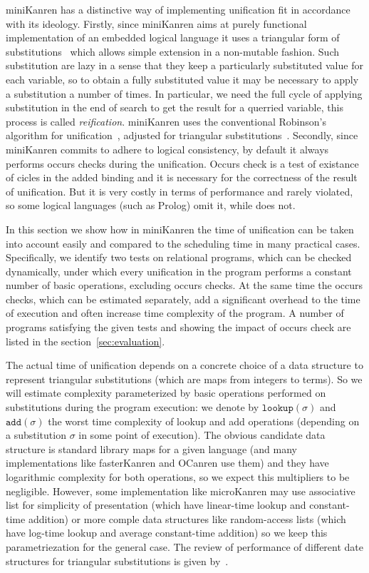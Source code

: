 \documentclass[acmsmall, anonymous, review]{acmart}
\newcommand{\sectionword}{section}
\newcommand{\mK}{miniKanren\xspace}
\newcommand{\lookuptime}[1]{\texttt{lookup}(#1)}
\newcommand{\addtime}[1]{\texttt{add}(#1)}
\begin{document}
\mK has a distinctive way of implementing unification fit in accordance with its ideology. Firstly, since \mK aims at purely functional implementation of an embedded logical language it uses a triangular form of substitutions~\cite{UnificationTheory} which allows simple extension in a non-mutable fashion. Such substitution are lazy in a sense that they keep a particularly substituted value for each variable, so to obtain a fully substituted value it may be necessary to apply a substitution a number of times. In particular, we need the full cycle of applying substitution in the end of search to get the result for a querried variable, this process is called \emph{reification}. \mK uses the conventional Robinson's algorithm for unification~\cite{UnificationTheory}, adjusted for triangular substitutions~\cite{TRS}. Secondly, since \mK commits to adhere to logical consistency, by default it always performs occurs checks during the unification. Occurs check is a test of existance of cicles in the added binding and it is necessary for the correctness of the result of unification. But it is very costly in terms of performance and rarely violated, so some logical languages (such as Prolog) omit it, while \mk does not.

In this section we show how in \mK the time of unification can be taken into account easily and compared to the scheduling time in many practical cases. Specifically, we identify two tests on relational programs, which can be checked dynamically, under which every unification in the program performs a constant number of basic operations, excluding occurs checks. At the same time the occurs checks, which can be estimated separately, add a significant overhead to the time of execution and often increase time complexity of the program. A number of programs satisfying the given tests and showing the impact of occurs check are listed in the \sectionword~\ref{sec:evaluation}.

The actual time of unification depends on a concrete choice of a data structure to represent triangular substitutions (which are maps from integers to terms). So we will estimate complexity parameterized by basic operations performed on substitutions during the program execution: we denote by $\lookuptime{\sigma}$ and $\addtime{\sigma}$ the worst time complexity of lookup and add operations (depending on a substitution $\sigma$ in some point of execution). The obvious candidate data structure is standard library maps for a given language (and many implementations like fasterKanren and OCanren use them) and they have logarithmic complexity for both operations, so we expect this multipliers to be negligible. However, some implementation like microKanren may use associative list for simplicity of presentation (which have linear-time lookup and constant-time addition) or more comple data structures like random-access lists (which have log-time lookup and average constant-time addition) so we keep this parametriezation for the general case. The review of performance of different date structures for triangular substitutions is given by~\citet{SubstDataStructs}.
\end{document}
